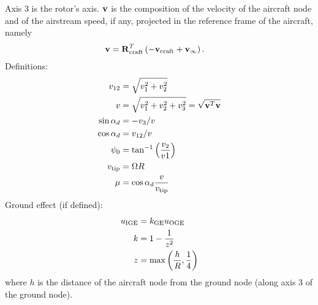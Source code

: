 %
%
%
%
%
% 
%
%
%

Axis 3 is the rotor's axis.
$\bm{\mathbf{v}}$ is the composition of the velocity of the aircraft node
and of the airstream speed, if any, projected in the reference frame
of the aircraft, namely
\begin{align}
	\bm{\mathbf{v}}
	&=
	\bm{\mathbf{R}}_\text{craft}^T \left( 
		- \bm{\mathbf{v}}_\text{craft}
		+ \bm{\mathbf{v}}_\infty
	 \right)
	.
\end{align}
Definitions:
\begin{subequations}
\begin{align}
	v_{12}
	&=
	\sqrt{v_1^2 + v_2^2}
	\\
	v
	&=
	\sqrt{v_1^2 + v_2^2 + v_3^2}
	= \sqrt{\bm{\mathbf{v}}^T \bm{\mathbf{v}}}
	\\
	\sin\alpha_d
	&=
	-v_3/v
	\\
	\cos\alpha_d
	&=
	v_{12}/v
	\\
	\psi_0
	&=
	\tan^{-1}\left( \frac{v_2}{v1} \right)
	\\
	v_\text{tip}
	&=
	\Omega R
	\\
	\mu
	&=
	\cos\alpha_d \frac{v}{v_\text{tip}}
\end{align}
\end{subequations}
Ground effect (if defined):
\begin{subequations}
\begin{align}
	u_\text{IGE}
	&=
	k_\text{GE} u_\text{OGE}
	\\
	k
	&=
	1 - \frac{1}{z^2}
	\\
	z
	&= \max\left( \frac{h}{R}, \frac{1}{4} \right)
\end{align}
\end{subequations}
where $h$ is the distance of the aircraft node from the ground node
(along axis 3 of the ground node).


